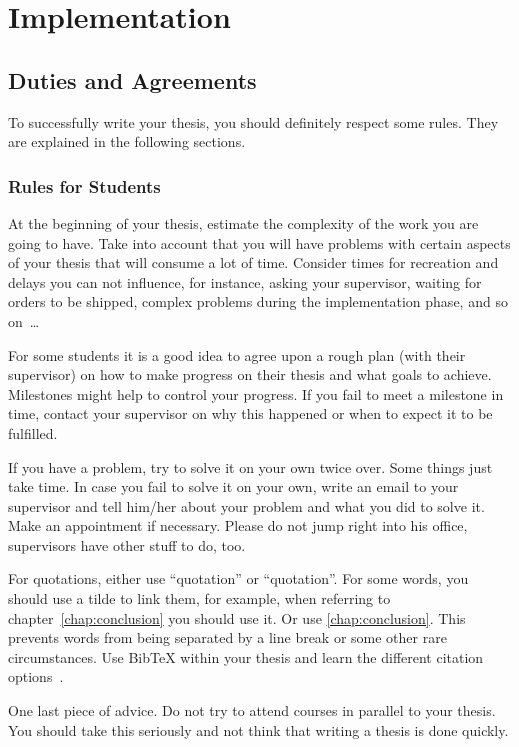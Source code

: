 \chapter{Implementation} \label{chap:impl}

\section{Duties and Agreements}

To successfully write your thesis, you should definitely respect some rules. They are explained in the following sections.

\subsection{Rules for Students}
At the beginning of your thesis, estimate the complexity of the work you are going to have. Take into account that you will have problems with certain aspects of your thesis that will consume a lot of time. Consider times for recreation and delays you can not influence, for instance, asking your supervisor, waiting for orders to be shipped, complex problems during the implementation phase, and so on~\dots

For some students it is a good idea to agree upon a rough plan (with their supervisor) on how to make progress on their thesis and what goals to achieve. Milestones might help to control your progress. If you fail to meet a milestone in time, contact your supervisor on why this happened or when to expect it to be fulfilled.

If you have a problem, try to solve it on your own twice over. Some things just take time. In case you fail to solve it on your own, write an email to your supervisor and tell him/her about your problem and what you did to solve it. Make an appointment if necessary. Please do not jump right into his office, supervisors have other stuff to do, too.

For quotations, either use ``quotation'' or \enquote{quotation}. For some words, you should use a tilde to link them, for example, when referring to chapter~\ref{chap:conclusion} you should use it. Or use \autoref{chap:conclusion}. This prevents words from being separated by a line break or some other rare circumstances. Use BibTeX within your thesis and learn the different citation options~\cite{Xie:2008:SBS,Newsome:05:DTA}.

One last piece of advice. Do not try to attend courses in parallel to your thesis. You should take this seriously and not think that writing a thesis is done quickly.


